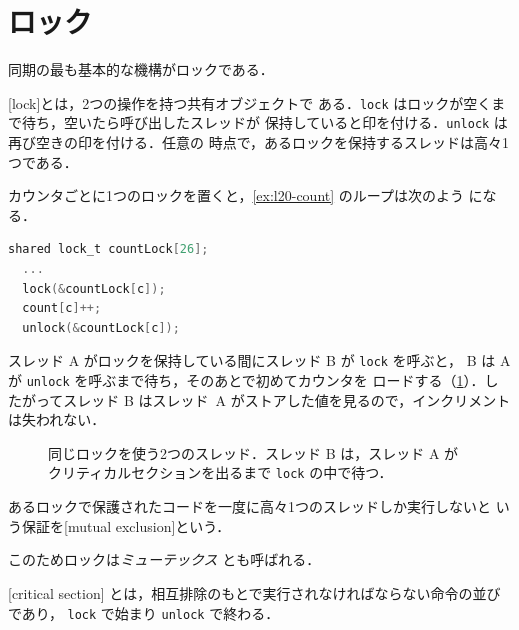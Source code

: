 \documentclass[../main.tex]{subfiles}
\begin{document}
\section{ロック}
\label{sec:l20-locks}

同期の最も基本的な機構がロックである．

\begin{definition}[ロック]
  [lock]とは，2つの操作を持つ共有オブジェクトで
  ある．\texttt{lock} はロックが空くまで待ち，空いたら呼び出したスレッドが
  保持していると印を付ける．\texttt{unlock} は再び空きの印を付ける．任意の
  時点で，あるロックを保持するスレッドは高々1つである．
\end{definition}

カウンタごとに1つのロックを置くと，\cref{ex:l20-count} のループは次のよう
になる．
\begin{lstlisting}[language=C, numbers=none, morekeywords={shared}]
shared lock_t countLock[26];
  ...
  lock(&countLock[c]);
  count[c]++;
  unlock(&countLock[c]);
\end{lstlisting}
スレッド A がロックを保持している間にスレッド B が \texttt{lock} を呼ぶと，
B は A が \texttt{unlock} を呼ぶまで待ち，そのあとで初めてカウンタを
ロードする（\cref{fig:l20-lock-timing}）．したがってスレッド B はスレッド~A
がストアした値を見るので，インクリメントは失われない．

\begin{figure}[htbp]
  \centering
  
  \caption{同じロックを使う2つのスレッド．スレッド B は，スレッド A が
    クリティカルセクションを出るまで \texttt{lock} の中で待つ．}
  \label{fig:l20-lock-timing}
\end{figure}

\begin{definition}[相互排除]
  あるロックで保護されたコードを一度に高々1つのスレッドしか実行しないと
  いう保証を[mutual exclusion]という．
\end{definition}

このためロックは\emph{ミューテックス}%
とも呼ばれる．

\begin{definition}[クリティカルセクション]
  [critical section]
  とは，相互排除のもとで実行されなければならない命令の並びであり，
  \texttt{lock} で始まり \texttt{unlock} で終わる．
\end{definition}
\end{document}

